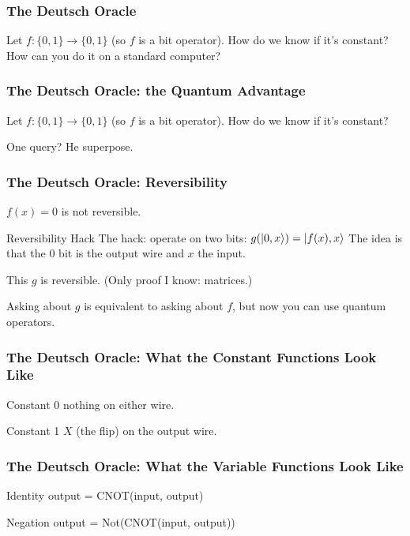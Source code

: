 \documentclass{beamer}
\begin{document}
\begin{frame}
\frametitle{The Deutsch Oracle}

Let $f: \{0, 1\} \to \{0, 1\}$ (so $f$ is a bit operator).
How do we know if it's constant? How can you do it on a standard computer?

\end{frame}

\begin{frame}
\frametitle{The Deutsch Oracle: the Quantum Advantage}

Let $f: \{0, 1\} \to \{0, 1\}$ (so $f$ is a bit operator).
How do we know if it's constant?

One query? He superpose.

\end{frame}

\begin{frame}
\frametitle{The Deutsch Oracle: Reversibility}

$f(x) = 0$ is not reversible.

\begin{block}{Reversibility Hack}
    The hack: operate on two bits: $g(\ket{0, x}) = \ket{f(x), x}$
    The idea is that the 0 bit is the output wire and $x$ the input.
\end{block}

This $g$ is reversible. (Only proof I know: matrices.)

Asking about $g$ is equivalent to asking about $f$, but now you can use quantum operators.

\end{frame}

\begin{frame}
\frametitle{The Deutsch Oracle: What the Constant Functions Look Like}

\begin{block}{Constant 0}
nothing on either wire.
\end{block}

\begin{block}{Constant 1}
$X$ (the flip) on the output wire.
\end{block}

\end{frame}

\begin{frame}
\frametitle{The Deutsch Oracle: What the Variable Functions Look Like}

\begin{block}{Identity}
output = CNOT(input, output)
\end{block}

\begin{block}{Negation}
output = Not(CNOT(input, output))
\end{block}

\end{frame}
\end{document}
